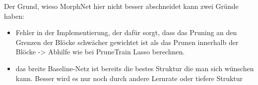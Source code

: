 


Der Grund, wieso MorphNet hier nicht besser abschneidet kann zwei Gründe haben:
\begin{itemize}
 \item Fehler in der Implementierung, der dafür sorgt, dass das Pruning an den Grenzen der Blöcke schwächer gewichtet ist als das Prunen innerhalb der Blöcke -> Abhilfe wie bei PruneTrain Lasso berechnen.
 \item das breite Baseline-Netz ist bereits die bestes Struktur die man sich wünschen kann. Besser wird es nur noch durch andere Lernrate oder tiefere Struktur
\end{itemize}












